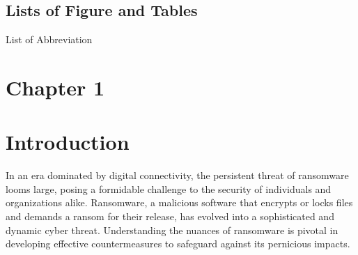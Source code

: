 \documentclass[12pt,letterpaper]{article}
\begin{document}
\newpage
    \begin{center}
        \vspace*{1cm}
            \section*{Lists of Figure and Tables}

                
        \vspace{1.2cm}
        
    \end{center}
    


\newpage
    \begin{center}
        \vspace*{1cm}
            \LARGE List of Abbreviation
        
        \vspace{1.2cm}
        
    \end{center}
    


\newpage
    \begin{center}
        \tableofcontents
        \newpage
        \clearpage
    \end{center}


\newpage
{}
\section*{Chapter 1}
\vspace*{1.2 cm}

    \section{Introduction}

    In an era dominated by digital connectivity, the persistent threat of ransomware looms large, posing a formidable challenge to the security of individuals and organizations alike. Ransomware, a malicious software that encrypts or locks files and demands a ransom for their release, has evolved into a sophisticated and dynamic cyber threat. Understanding the nuances of ransomware is pivotal in developing effective countermeasures to safeguard against its pernicious impacts.\cite{AKBANOV2019111}
\end{document}
